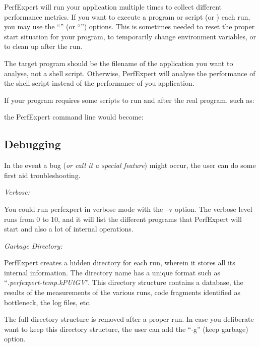 PerfExpert will run your application multiple times to collect different performance metrics. If you want to execute a program or script  (or ) each run, you may use the ``'' (or ``'') options. This is sometimes needed to reset the proper start situation for your program, to temporarily change environment variables, or to clean up after the run.

The target program should be the filename of the application you want to analyse, not a shell script. Otherwise, PerfExpert will analyse the performance of the shell script instead of the performance of you application.

If your program requires some scripts to run and after the real program, such as:

\begin{prompt}
\end{prompt}

the PerfExpert command line would become:

\begin{prompt}
\end{prompt}

\subsection{Debugging}
\label{subsec:Debugging}

In the event a bug (\textit{or call it a special feature}) might occur, the user can do some first aid troubleshooting.

\emph{Verbose:}

You could run perfexpert in verbose mode with the --v option. The verbose level runs from 0 to 10, and it will list the different programs that PerfExpert will start and also a lot of internal operations.

\emph{Garbage Directory:}

PerfExpert creates a hidden directory for each run, wherein it stores all its internal information. The directory name has a unique format such as ``\textit{.perfexpert-temp.kPUtGV}''. This directory structure contains a database, the results of the measurements of the various runs, code fragments identified as bottleneck, the log files, etc.

The full directory structure is removed after a proper run. In case you deliberate want to keep this directory structure, the user can add the ``-g'' (keep garbage) option.

